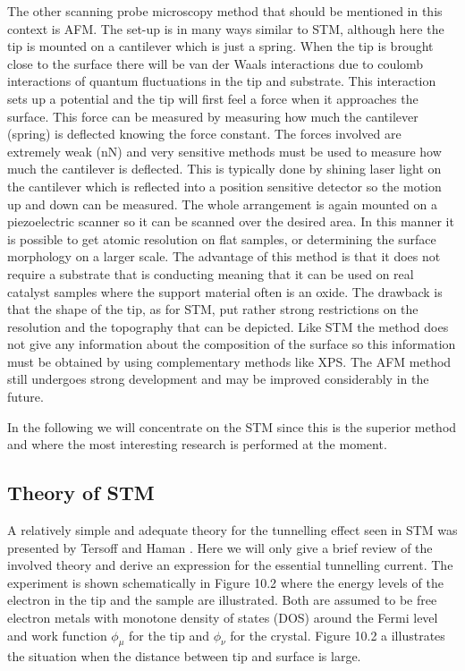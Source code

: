 The other scanning probe microscopy method that should be mentioned in this context is AFM. The set-up is in many ways similar to STM, although here the tip is mounted on a cantilever which is just a spring. When the tip is brought close to the surface there will be van der Waals interactions due to coulomb interactions of quantum fluctuations in the tip and substrate. This interaction sets up a potential and the tip will first feel a force when it approaches the surface. This force can be measured by measuring how much the cantilever (spring) is deflected knowing the force constant. The forces involved are extremely weak (\si{nN}) and very sensitive methods must be used to measure how much the cantilever is deflected. This is typically done by shining laser light on the cantilever which is reflected into a position sensitive detector so the motion up and down can be measured. The whole arrangement is again mounted on a piezoelectric scanner so it can be scanned over the desired area. In this manner it is possible to get atomic resolution on flat samples, or determining the  surface morphology on a larger scale. The advantage of this method is that it does not require a substrate that is conducting meaning that it can be used on real catalyst samples where the support material often is an oxide. The drawback is  that the shape of the tip, as for STM, put rather strong restrictions on the resolution and the topography that can be depicted. Like STM the method does not give any information about the composition of the surface so this information must be obtained by using complementary methods like XPS. The AFM method still undergoes strong development and may be improved considerably in the future.

In the following we will concentrate on the STM since this is the superior method and where the most interesting research is performed at the moment.

\subsection{Theory of STM}
A relatively simple and adequate theory for the tunnelling effect seen in STM was presented by Tersoff and Haman \cite{Tersoff}. Here we will only give a brief review of the involved theory and derive an expression for the essential tunnelling current. The experiment is shown schematically in Figure 10.2 where the energy levels of the electron in the tip and the sample are illustrated. Both are assumed to be free electron metals with monotone density of states (DOS) around the Fermi level and work function $\phi_{\mu}$  for the tip and  $\phi_{\nu}$ for the crystal. Figure 10.2 a illustrates the situation when the distance  between tip and surface is large. 


